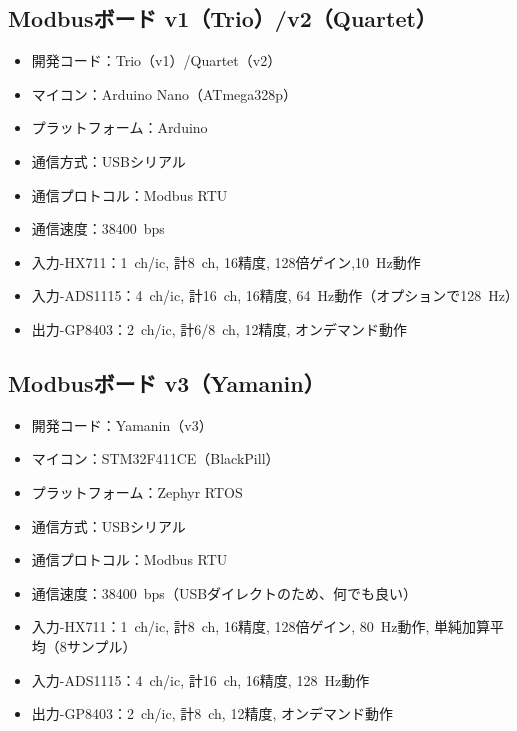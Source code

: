\subsection{Modbusボード v1（Trio）/v2（Quartet）}
\begin{itemize}
    \item 開発コード：Trio（v1）/Quartet（v2）
    \item マイコン：Arduino Nano（ATmega328p）
    \item プラットフォーム：Arduino
    \item 通信方式：USBシリアル
    \item 通信プロトコル：Modbus RTU
    \item 通信速度：\qty{38400}{bps}
    \item 入力-HX711：\qty{1}{ch}/ic, 計\qty{8}{ch}, \qty{16}{\bit}精度, 128倍ゲイン,\qty{10}{\Hz}動作
    \item 入力-ADS1115：\qty{4}{ch}/ic, 計\qty{16}{ch}, \qty{16}{\bit}精度, \qty{64}{\Hz}動作（オプションで\qty{128}{\Hz}）
    \item 出力-GP8403：\qty{2}{ch}/ic, 計6/\qty{8}{ch}, \qty{12}{\bit}精度, オンデマンド動作
\end{itemize}

\subsection{Modbusボード v3（Yamanin）}
\begin{itemize}
    \item 開発コード：Yamanin（v3）
    \item マイコン：STM32F411CE（BlackPill）
    \item プラットフォーム：Zephyr RTOS
    \item 通信方式：USBシリアル
    \item 通信プロトコル：Modbus RTU
    \item 通信速度：\qty{38400}{bps}（USBダイレクトのため、何でも良い）
    \item 入力-HX711：\qty{1}{ch}/ic, 計\qty{8}{ch}, \qty{16}{\bit}精度, 128倍ゲイン, \qty{80}{\Hz}動作, 単純加算平均（8サンプル）
    \item 入力-ADS1115：\qty{4}{ch}/ic, 計\qty{16}{ch}, \qty{16}{\bit}精度, \qty{128}{\Hz}動作
    \item 出力-GP8403：\qty{2}{ch}/ic, 計\qty{8}{ch}, \qty{12}{\bit}精度, オンデマンド動作
\end{itemize}


